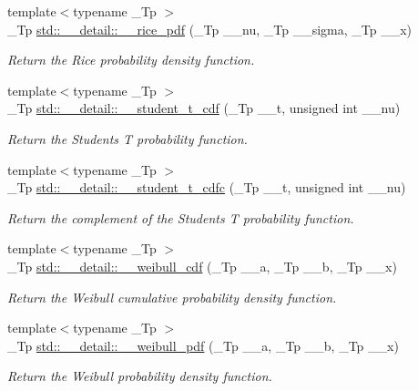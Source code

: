 \begin{DoxyCompactItemize}
{\footnotesize template$<$typename \+\_\+\+Tp $>$ }\\\+\_\+\+Tp \hyperlink{namespacestd_1_1____detail_a571f37fdf793a91985073a58a873e731}{std\+::\+\_\+\+\_\+detail\+::\+\_\+\+\_\+rice\+\_\+pdf} (\+\_\+\+Tp \+\_\+\+\_\+nu, \+\_\+\+Tp \+\_\+\+\_\+sigma, \+\_\+\+Tp \+\_\+\+\_\+x)
\begin{DoxyCompactList}\small\item\em Return the Rice probability density function. \end{DoxyCompactList}\item 
{\footnotesize template$<$typename \+\_\+\+Tp $>$ }\\\+\_\+\+Tp \hyperlink{namespacestd_1_1____detail_aadc19f2a38494343a752a8d4f924e3df}{std\+::\+\_\+\+\_\+detail\+::\+\_\+\+\_\+student\+\_\+t\+\_\+cdf} (\+\_\+\+Tp \+\_\+\+\_\+t, unsigned int \+\_\+\+\_\+nu)
\begin{DoxyCompactList}\small\item\em Return the Students T probability function. \end{DoxyCompactList}\item 
{\footnotesize template$<$typename \+\_\+\+Tp $>$ }\\\+\_\+\+Tp \hyperlink{namespacestd_1_1____detail_a3009eaaa4b7d6d845878765ef0e3fa27}{std\+::\+\_\+\+\_\+detail\+::\+\_\+\+\_\+student\+\_\+t\+\_\+cdfc} (\+\_\+\+Tp \+\_\+\+\_\+t, unsigned int \+\_\+\+\_\+nu)
\begin{DoxyCompactList}\small\item\em Return the complement of the Students T probability function. \end{DoxyCompactList}\item 
{\footnotesize template$<$typename \+\_\+\+Tp $>$ }\\\+\_\+\+Tp \hyperlink{namespacestd_1_1____detail_aeb9a99b7ca44c9e403f78baf38dc293b}{std\+::\+\_\+\+\_\+detail\+::\+\_\+\+\_\+weibull\+\_\+cdf} (\+\_\+\+Tp \+\_\+\+\_\+a, \+\_\+\+Tp \+\_\+\+\_\+b, \+\_\+\+Tp \+\_\+\+\_\+x)
\begin{DoxyCompactList}\small\item\em Return the Weibull cumulative probability density function. \end{DoxyCompactList}\item 
{\footnotesize template$<$typename \+\_\+\+Tp $>$ }\\\+\_\+\+Tp \hyperlink{namespacestd_1_1____detail_ab15a21521bc750303938a108c5a0bb0b}{std\+::\+\_\+\+\_\+detail\+::\+\_\+\+\_\+weibull\+\_\+pdf} (\+\_\+\+Tp \+\_\+\+\_\+a, \+\_\+\+Tp \+\_\+\+\_\+b, \+\_\+\+Tp \+\_\+\+\_\+x)
\begin{DoxyCompactList}\small\item\em Return the Weibull probability density function. \end{DoxyCompactList}\end{DoxyCompactItemize}


